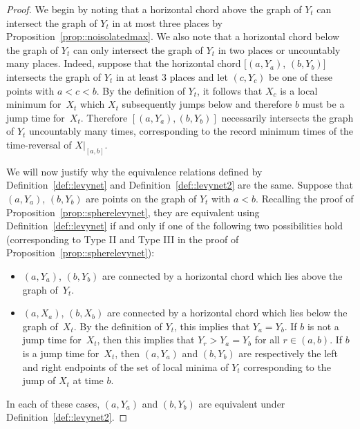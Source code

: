 \documentclass[10pt]{amsart}
\theoremstyle{plain}
\numberwithin{theorem}{section}
\theoremstyle{definition}
\begin{document}
\begin{proof}

We begin by noting that a horizontal chord above the graph of $Y_t$ can intersect the graph of $Y_t$ in at most three places by Proposition~\ref{prop::noisolatedmax}. We also note that a horizontal chord below the graph of $Y_t$ can only intersect the graph of $Y_t$ in two places or uncountably many places. Indeed, suppose that the horizontal chord $[(a,Y_a)$, $(b,Y_b)]$ intersects the graph of $Y_t$ in at least $3$ places and let $(c,Y_c)$ be one of these points with $a < c < b$. By the definition of $Y_t$, it follows that $X_c$ is a local minimum for~$X_t$ which $X_t$ subsequently jumps below and therefore $b$ must be a jump time for~$X_t$. Therefore $[(a,Y_a),(b,Y_b)]$ necessarily intersects the graph of $Y_t$ uncountably many times, corresponding to the record minimum times of the time-reversal of $X|_{[a,b]}$.

We will now justify why the equivalence relations defined by Definition~\ref{def::levynet} and Definition~\ref{def::levynet2} are the same. Suppose that $(a,Y_a)$, $(b,Y_b)$ are points on the graph of $Y_t$ with $a < b$. Recalling the proof of Proposition~\ref{prop::spherelevynet}, they are equivalent using Definition~\ref{def::levynet} if and only if one of the following two possibilities hold (corresponding to Type II and Type III in the proof of Proposition~\ref{prop::spherelevynet}):
\begin{itemize}
\item $(a,Y_a)$, $(b,Y_b)$ are connected by a horizontal chord which lies above the graph of~$Y_t$.
\item $(a,X_a)$, $(b,X_b)$ are connected by a horizontal chord which lies below the graph of~$X_t$. By the definition of $Y_t$, this implies that $Y_a = Y_b$. If $b$ is not a jump time for~$X_t$, then this implies that $Y_r > Y_a = Y_b$ for all $r \in (a,b)$. If $b$ is a jump time for~$X_t$, then $(a,Y_a)$ and $(b,Y_b)$ are respectively the left and right endpoints of the set of local minima of $Y_t$ corresponding to the jump of $X_t$ at time $b$.
\end{itemize}
In each of these cases, $(a,Y_a)$ and $(b,Y_b)$ are equivalent under Definition~\ref{def::levynet2}.


\end{proof}
\end{document}
